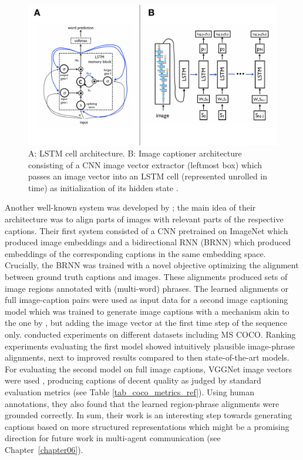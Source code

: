 \begin{figure}
	\centering
	\includegraphics[width=\linewidth]{images/vinyals_lstm.pdf}
	\caption{A: LSTM cell architecture. B: Image captioner architecture consisting of a CNN image vector extractor (leftmost box) which passes an image vector into an LSTM cell (represented unrolled in time) as initialization of its hidden state \parencite[][p. 2--3, Fig.~2--3]{vinyals2015show}.}
	\label{fig:lstm}
\end{figure}

Another well-known system was developed by \cite{karpathy2015deep}; the main idea of their architecture was to align parts of images with relevant parts of the respective captions. 
Their first system consisted of a CNN pretrained on ImageNet which produced image embeddings and a bidirectional RNN (BRNN) which produced embeddings of the corresponding captions in the same embedding space. Crucially, the BRNN was trained with a novel objective optimizing the alignment between ground truth captions and images. %
These alignments produced sets of image regions annotated with (multi-word) phrases.
The learned alignments or full image-caption pairs were used as input data for a second image captioning model which was trained to generate image captions with a mechanism akin to the one by \cite{vinyals2015show}, but adding the image vector at the first time step of the sequence only. \cite{karpathy2015deep} conducted experiments on different datasets including MS COCO. Ranking experiments evaluating the first model showed intuitively plausible image-phrase alignments, next to improved results compared to then state-of-the-art models. 
For evaluating the second model on full image captions, VGGNet image vectors were used \parencite{simonyan2014very}, producing captions of decent quality as judged by standard evaluation metrics (see Table \ref{tab_coco_metrics_ref}). Using human annotations, they also found that the learned region-phrase alignments were grounded correctly. %
In sum, their work is an interesting step towards generating captions based on more structured representations which might be a promising direction for future work in multi-agent communication (see Chapter~\ref{chapter06}).

